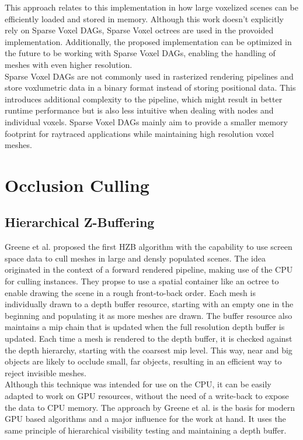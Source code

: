 \noindent
This approach relates to this implementation in how large voxelized scenes can be efficiently loaded and stored in 
memory. Although this work doesn't explicitly rely on Sparse Voxel \ac{DAG}s, Sparse Voxel octrees are used in the 
provoided implementation. Additionally, the proposed implementation can be optimized in the future to be working 
with Sparse Voxel \ac{DAG}s, enabling the handling of meshes with even higher resolution. \\

\noindent
Sparse Voxel \ac{DAG}s are not commonly used in rasterized rendering pipelines and store voxlumetric data in a binary 
format instead of storing positional data. This introduces additional complexity to the pipeline, which might result in 
better runtime performance but is also less intuitive when dealing with nodes and individual voxels. Sparse Voxel 
\ac{DAG}s mainly aim to provide a smaller memory footprint for raytraced applications while maintaining high resolution 
voxel meshes.


\section{Occlusion Culling}


\subsection*{Hierarchical Z-Buffering}

Greene et al. \cite{Greene93,Greene95} proposed the first \ac{HZB} algorithm with the capability to use screen space 
data to cull meshes in large and densly populated scenes. The idea originated in the context of a forward rendered 
pipeline, making use of the \ac{CPU} for culling instances. They propse to use a spatial container like an octree to 
enable drawing the scene in a rough front-to-back order. Each mesh is individually drawn to a depth buffer resource, 
starting with an empty one in the beginning and populating it as more meshes are drawn. The buffer resource also 
maintains a mip chain that is updated when the full resolution depth buffer is updated. Each time a mesh is rendered 
to the depth buffer, it is checked against the depth hierarchy, starting with the coarsest mip level. This way, near 
and big objects are likely to occlude small, far objects, resulting in an efficient way to reject invisible meshes.\\

\noindent
Although this technique was intended for use on the \ac{CPU}, it can be easily adapted to work on \ac{GPU} resources, 
without the need of a write-back to expose the data to \ac{CPU} memory. The approach by Greene et al. is the basis for 
modern \ac{GPU} based algorithms and a major influence for the work at hand. It uses the same principle of hierarchical 
visibility testing and maintaining a depth buffer. \\

